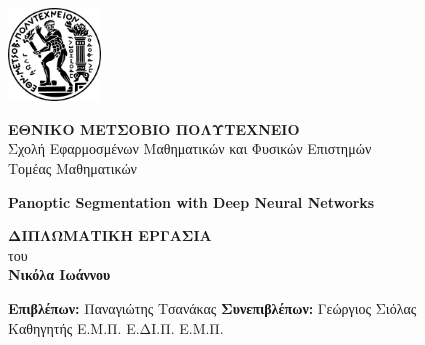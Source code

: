 \documentclass[12pt]{article}
\begin{document}
\thispagestyle{empty}
\begin{center}
    \includegraphics[width=0.185\textwidth]{images/ntua_logo.png} \\ %
    \noindent\rule{0pt}{1.5em}


    \textbf{\Large ΕΘΝΙΚΟ ΜΕΤΣΟΒΙΟ ΠΟΛΥΤΕΧΝΕΙΟ} \\[0.5em]
    Σχολή Εφαρμοσμένων Μαθηματικών και Φυσικών Επιστημών \\[0.5em]
    Τομέας Μαθηματικών \\[3em]

\vspace{1.9cm} 

    {
    
    \textbf{\Large Panoptic Segmentation with Deep Neural Networks} \\[2em]
    }

    \textbf{\LARGE ΔΙΠΛΩΜΑΤΙΚΗ ΕΡΓΑΣΙΑ} \\[1.5em]

    του \\
    \textbf{Νικόλα Ιωάννου} \\[4em]

\vspace{1.8cm} 


\hspace*{-0.3cm}\textbf{Επιβλέπων:} Παναγιώτης Τσανάκας       \hspace*{3.65cm} \textbf{Συνεπιβλέπων:} Γεώργιος Σιόλας \\
\hspace*{1.76cm}Καθηγητής Ε.Μ.Π.  \hspace*{7.23cm}Ε.ΔΙ.Π. Ε.Μ.Π.

\vspace{5.5 cm} 






 \\
\end{center}
\newpage
\mbox{}
\newpage
\end{document}
